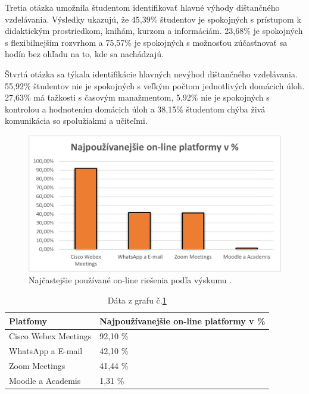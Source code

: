 \documentclass[10pt,oneside,slovak,a4paper]{article}
\begin{document}
Tretia otázka umožnila študentom identifikovať hlavné výhody dištančného vzdelávania.
Výsledky ukazujú, že 45,39\% študentov je spokojných s prístupom k didaktickým prostriedkom, knihám, kurzom a informáciám. 23,68\% je spokojných s flexibilnejším rozvrhom
a 75,57\% je spokojných s možnosťou zúčasťnovať sa hodín bez ohľadu na to, kde sa nachádzajú.

Štvrtá otázka sa týkala identifikácie hlavných nevýhod dištančného vzdelávania. 55,92\% študentov nie je spokojných s veľkým počtom jednotlivých domácich úloh.
27,63\% má ťažkosti s časovým manažmentom, 5,92\% nie je spokojných s kontrolou a hodnotením domácich úloh a 38,15\% študentom chýba živá komunikácia so spolužiakmi a učiteľmi.

\begin{figure}[h]
	\centering
	\includegraphics[scale=0.35, width=\textwidth]{GrafOnlineRies.pdf}
	\caption{Najčastejšie používané on-line riešenia podľa výskumu \cite{covid19}.}
	\label{Graf1}
\end{figure}

\begin{table}[h]
	\centering
	\begin{tabular}{|l|l|}
	\hline
	\textbf{Platfomy}    & \textbf{Najpoužívanejšie on-line platformy v \%} \\ \hline
	Cisco Webex Meetings & 92,10 \%                                         \\ \hline
	WhatsApp a E-mail    & 42,10 \%                                         \\ \hline
	Zoom Meetings        & 41,44 \%                                         \\ \hline
	Moodle a Academis    & 1,31 \%                                          \\ \hline
	\end{tabular}
	\caption{Dáta z grafu č.\ref{Graf1} \cite{covid19}}
	\label{tabulka1}
\end{table}
\end{document}
